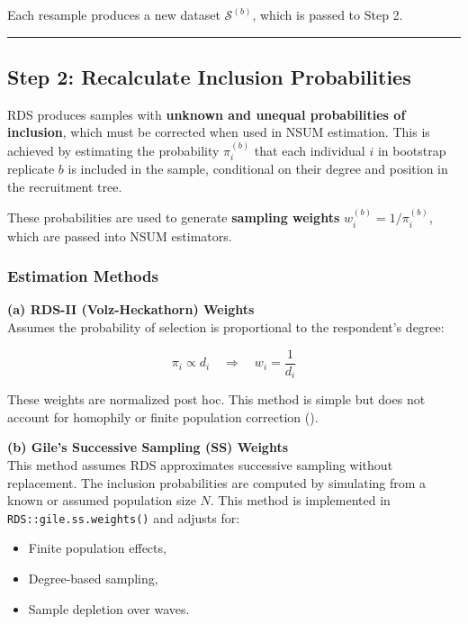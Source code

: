 \documentclass[
  12pt,
  letterpaper,
  DIV=11,
  numbers=noendperiod]{scrartcl}
\theoremstyle{plain}
\theoremstyle{definition}
\begin{document}
Each resample produces a new dataset \(\mathcal{S}^{(b)}\), which is
passed to Step 2.

\begin{center}\rule{0.5\linewidth}{0.5pt}\end{center}

\subsection{Step 2: Recalculate Inclusion
Probabilities}\label{step-2-recalculate-inclusion-probabilities}

RDS produces samples with \textbf{unknown and unequal probabilities of
inclusion}, which must be corrected when used in NSUM estimation. This
is achieved by estimating the probability \(\pi_i^{(b)}\) that each
individual \(i\) in bootstrap replicate \(b\) is included in the sample,
conditional on their degree and position in the recruitment tree.

These probabilities are used to generate \textbf{sampling weights}
\(w_i^{(b)} = 1/\pi_i^{(b)}\), which are passed into NSUM estimators.

\subsubsection{Estimation Methods}\label{estimation-methods}

\textbf{(a) RDS-II (Volz-Heckathorn) Weights}\\
Assumes the probability of selection is proportional to the respondent's
degree:

\[\pi_i \propto d_i \quad \Rightarrow \quad w_i = \frac{1}{d_i}\]

These weights are normalized post hoc. This method is simple but does
not account for homophily or finite population correction
(\textcite{volz08-rds}).

\textbf{(b) Gile's Successive Sampling (SS) Weights}\\
This method assumes RDS approximates successive sampling without
replacement. The inclusion probabilities are computed by simulating from
a known or assumed population size \(N\). This method is implemented in
\texttt{RDS::gile.ss.weights()} and adjusts for:

\begin{itemize}
\item
  Finite population effects,
\item
  Degree-based sampling,
\item
  Sample depletion over waves.
\end{itemize}
\end{document}
